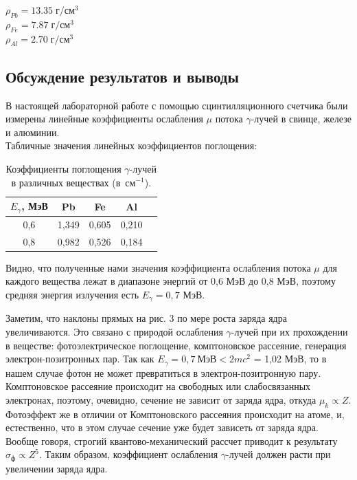 \documentclass[a4paper,12pt]{article} %
\begin{document}
	\begin{center}
		$\rho_{Pb} = 13.35 \; {\text{г}} /  {\text{см}}^3 $\\
		$\rho_{Fe} = 7.87  \;  {\text{г}} /  {\text{см}}^3 $\\
		$\rho_{Al} = 2.70 \;   {\text{г}} /  {\text{см}}^3 $\\
	\end{center}
			
\newpage
\subsection*{Обсуждение результатов и выводы}
	В настоящей лабораторной работе с помощью сцинтилляционного счетчика были измерены  линейные коэффициенты ослабления $\mu$ потока $\gamma$-лучей в свинце, железе и алюминии. \\
 
    Табличные значения линейных коэффициентов поглощения:

	\begin{table}[h!]
        \begin{center}
		\begin{tabular}{|c|c|c|c|c|}
			\hline
			$E_\gamma$, МэВ & Pb    & Fe    & Al    \\ \hline
			0,6             & 1,349 & 0,605 & 0,210     \\ \hline
			0,8             & 0,982 & 0,526 & 0,184   \\ \hline
		\end{tabular}
  	\caption{Коэффициенты поглощения $\gamma$-лучей в различных веществах (в~см$^{-1}$).}
		\label{table:spravocka}
         \end{center}
	\end{table}

	Видно, что полученные нами значения коэффициента ослабления потока $\mu$ для каждого вещества лежат в диапазоне энергий от 0,6 МэВ до 0,8 МэВ, поэтому средняя энергия излучения есть $E_\gamma = 0,7$ МэВ.
	
	Заметим, что наклоны прямых на рис. 3 по мере роста заряда ядра увеличиваются. Это связано с природой ослабления $\gamma$-лучей при их прохождении в веществе: фотоэлектрическое поглощение, комптоновское рассеяние, генерация электрон-позитронных пар. Так как $E_\gamma = 0,7 \ \text{МэВ} < 2mc^2$ = 1,02 МэВ, то в нашем случае фотон не может превратиться в электрон-позитронную пару. Комптоновское рассеяние происходит на свободных или слабосвязанных электронах, поэтому, очевидно, сечение не зависит от заряда ядра, откуда $\mu_k \propto Z$. Фотоэффект же в отличии от Комптоновского рассеяния происходит на атоме, и, естественно, что в этом случае сечение уже будет зависеть от заряда ядра. Вообще говоря, строгий квантово-механический рассчет приводит к результату $\sigma_\text{ф} \propto Z^5$. Таким образом, коэффициент ослабления $\gamma$-лучей должен расти при увеличении заряда ядра. 
	

	
\end{document}

